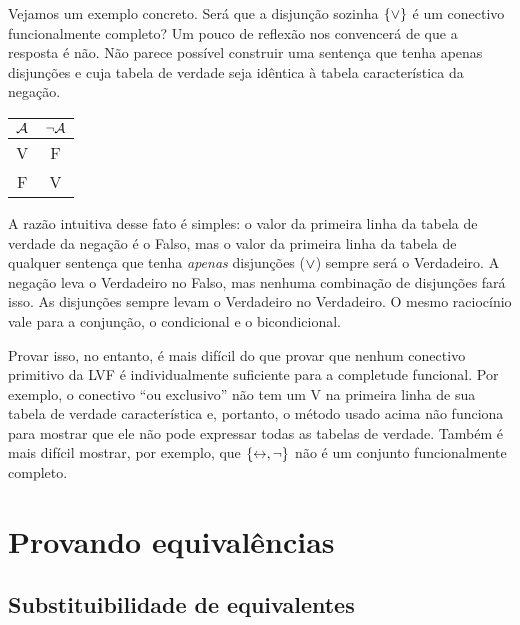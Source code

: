 Vejamos um exemplo concreto.
Será que a disjunção sozinha $\{\vee\}$ é um conectivo funcionalmente completo?
Um pouco de reflexão nos convencerá de que a resposta é não.
Não parece possível construir uma sentença que tenha apenas disjunções e cuja tabela de verdade seja idêntica à tabela característica da negação.
				\begin{center}
				\begin{tabular}{c | c}
				$\mathcal{A}$ & $\neg \mathcal{A}$\\
				\hline
				 V & F \\
				 F & V
				\end{tabular}
				\end{center}
A razão intuitiva desse fato é simples: o valor da primeira linha da tabela de verdade da negação é o Falso, mas o valor da primeira linha da tabela de qualquer sentença que tenha \emph{apenas} disjunções ($\vee$) sempre será o Verdadeiro.
A negação leva o Verdadeiro no Falso, mas nenhuma combinação de disjunções fará isso.
As disjunções sempre levam o Verdadeiro no Verdadeiro.
O mesmo raciocínio vale para a conjunção, o condicional e o bicondicional.

Provar isso, no entanto, é mais difícil do que provar que nenhum conectivo primitivo da LVF é individualmente suficiente para a completude funcional.
Por exemplo, o conectivo ``ou exclusivo'' não tem um V na primeira linha de sua tabela de verdade característica e, portanto, o método usado acima não funciona para mostrar que ele não pode expressar todas as tabelas de verdade.
Também é mais difícil mostrar, por exemplo, que  $\{\leftrightarrow, \neg\}$ não é um conjunto funcionalmente completo.


\chapter{Provando equivalências}\label{ch:equivalences}

\section{Substituibilidade  de equivalentes}

